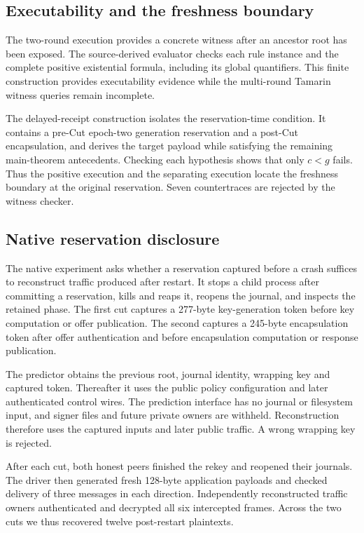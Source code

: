 \documentclass[pdflatex]{sn-jnl}
\theoremstyle{thmstyleone}
\theoremstyle{thmstylethree}
\theoremstyle{thmstyletwo}
\begin{document}
\subsection{Executability and the freshness boundary}

The two-round execution provides a concrete witness after an
ancestor root has been exposed. The source-derived evaluator checks each
rule instance and the complete positive existential formula, including its
global quantifiers. This finite construction provides executability
evidence while the multi-round Tamarin witness queries
remain incomplete.

The delayed-receipt construction isolates the reservation-time condition.
It contains a pre-Cut epoch-two generation reservation and a post-Cut
encapsulation, and derives the target payload while satisfying the remaining
main-theorem antecedents. Checking each hypothesis shows that only $c<g$
fails. Thus the positive execution and the separating execution locate
the freshness boundary at the original reservation. Seven countertraces are
rejected by the witness checker.

\subsection{Native reservation disclosure}

The native experiment asks whether a reservation captured before a crash
suffices to reconstruct traffic produced after restart. It stops a child
process after committing a reservation, kills and reaps it, reopens the
journal, and inspects the retained phase. The first cut captures a 277-byte
key-generation token before key computation or offer publication. The
second captures a 245-byte encapsulation token after offer authentication
and before encapsulation computation or response publication.

The predictor obtains the previous root, journal identity, wrapping key and
captured token. Thereafter it uses the public policy configuration and later
authenticated control wires. The prediction interface has no journal or
filesystem input, and signer files and future private owners are withheld.
Reconstruction therefore uses the captured inputs and later public traffic.
A wrong wrapping key is rejected.

After each cut, both honest peers finished the rekey and reopened their
journals. The driver then generated fresh 128-byte application
payloads and checked delivery of three messages in each direction.
Independently reconstructed traffic owners authenticated and decrypted
all six intercepted frames. Across the two cuts we thus recovered
twelve post-restart plaintexts.
\end{document}
